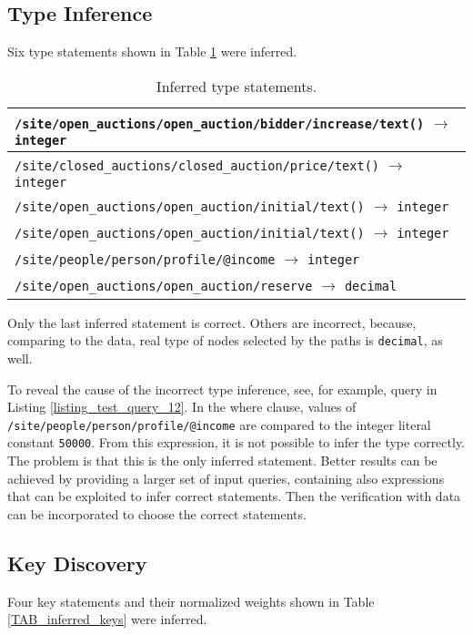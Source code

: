 \subsection{Type Inference}
Six type statements shown in Table \ref{TAB_inferred_types} were inferred.

\begin{table}
\begin{tabular}{|l|}
\hline
\texttt{/site/open\_auctions/open\_auction/bidder/increase/text()} $\rightarrow$ \texttt{integer} \\ \hline
\texttt{/site/closed\_auctions/closed\_auction/price/text()} $\rightarrow$ \texttt{integer} \\ \hline
\texttt{/site/open\_auctions/open\_auction/initial/text()} $\rightarrow$ \texttt{integer} \\ \hline
\texttt{/site/open\_auctions/open\_auction/initial/text()} $\rightarrow$ \texttt{integer} \\ \hline
\texttt{/site/people/person/profile/@income} $\rightarrow$ \texttt{integer} \\ \hline
\texttt{/site/open\_auctions/open\_auction/reserve} $\rightarrow$ \texttt{decimal} \\ \hline
\end{tabular}
\caption{Inferred type statements.}
\label{TAB_inferred_types}
\end{table}

Only the last inferred statement is correct. Others are incorrect, because, comparing to the data, real type of nodes selected by the paths is \texttt{decimal}, as well.

To reveal the cause of the incorrect type inference, see, for example, query in Listing \ref{listing_test_query_12}. In the where clause, values of \texttt{/site/people/person/profile/\-@income} are compared to the integer literal constant \texttt{50000}. From this expression, it is not possible to infer the type correctly. The problem is that this is the only inferred statement. Better results can be achieved by providing a larger set of input queries, containing also expressions that can be exploited to infer correct statements. Then the verification with data can be incorporated to choose the correct statements.

\subsection{Key Discovery}
Four key statements and their normalized weights shown in Table \ref{TAB_inferred_keys} were inferred.

